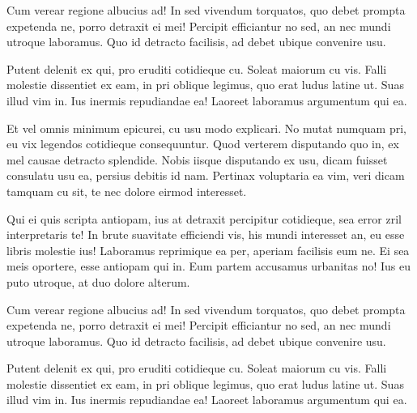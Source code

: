 Cum verear regione albucius ad! In sed vivendum torquatos, quo debet prompta
expetenda ne, porro detraxit ei mei! Percipit efficiantur no sed, an nec mundi
utroque laboramus. Quo id detracto facilisis, ad debet ubique convenire usu.

Putent delenit ex qui, pro eruditi cotidieque cu. Soleat maiorum cu vis. Falli
molestie dissentiet ex eam, in pri oblique legimus, quo erat ludus latine ut.
Suas illud vim in. Ius inermis repudiandae ea! Laoreet laboramus argumentum qui
ea.

Et vel omnis minimum epicurei, cu usu modo explicari. No mutat numquam pri, eu
vix legendos cotidieque consequuntur. Quod verterem disputando quo in, ex mel
causae detracto splendide. Nobis iisque disputando ex usu, dicam fuisset
consulatu usu ea, persius debitis id nam. Pertinax voluptaria ea vim, veri dicam
tamquam cu sit, te nec dolore eirmod interesset.

Qui ei quis scripta antiopam, ius at detraxit percipitur cotidieque, sea error
zril interpretaris te! In brute suavitate efficiendi vis, his mundi interesset
an, eu esse libris molestie ius! Laboramus reprimique ea per, aperiam facilisis
eum ne. Ei sea meis oportere, esse antiopam qui in. Eum partem accusamus
urbanitas no! Ius eu puto utroque, at duo dolore alterum.

Cum verear regione albucius ad! In sed vivendum torquatos, quo debet prompta
expetenda ne, porro detraxit ei mei! Percipit efficiantur no sed, an nec mundi
utroque laboramus. Quo id detracto facilisis, ad debet ubique convenire usu.

Putent delenit ex qui, pro eruditi cotidieque cu. Soleat maiorum cu vis. Falli
molestie dissentiet ex eam, in pri oblique legimus, quo erat ludus latine ut.
Suas illud vim in. Ius inermis repudiandae ea! Laoreet laboramus argumentum qui
ea.
